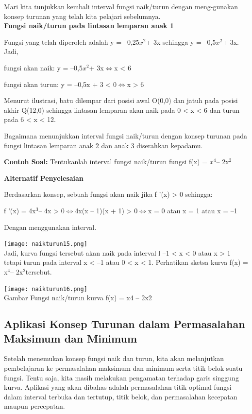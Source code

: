 \documentclass[11pt,fleqn]{book} %
\begin{document}
Mari kita tunjukkan kembali interval fungsi naik/turun dengan meng-gunakan konsep turunan yang telah kita pelajari sebelumnya.\\

\textbf{Fungsi naik/turun pada lintasan lemparan anak 1}

Fungsi yang telah diperoleh adalah y = –0,25$x^{2} $+ 3x sehingga y = –0,5$x^{2} $+ 3x. Jadi,

fungsi akan naik: y = –0,5$x^{2} $+ 3x$ \Leftrightarrow $x < 6

fungsi akan turun: y = –0,5x + 3 < 0$ \Leftrightarrow $x > 6

Menurut ilustrasi, batu dilempar dari posisi awal O(0,0) dan jatuh pada posisi akhir Q(12,0) sehingga lintasan lemparan akan naik pada 0 < x < 6 dan turun pada 6 < x < 12.

Bagaimana menunjukkan interval fungsi naik/turun
dengan konsep turunan pada fungsi lintasan lemparan
anak 2 dan anak 3 diserahkan kepadamu.

\textbf {Contoh Soal:} 
Tentukanlah interval fungsi naik/turun fungsi f(x) = $x^{4} $– 2x$^{2}$

\textbf{Alternatif Penyelesaian}

Berdasarkan konsep, sebuah fungsi akan naik jika f '(x) > 0 sehingga:

f '(x) = 4x$^{3} $– 4x > 0$ \Leftrightarrow $4x(x – 1)(x + 1) > 0$ \Leftrightarrow $x = 0 atau x = 1 atau x = –1

Dengan menggunakan interval.

\texttt{[image: naikturun15.png]}\\

Jadi, kurva fungsi tersebut akan naik pada interval l –1 < x < 0 atau x > 1 tetapi turun pada interval x < –1 atau 0 < x < 1. Perhatikan sketsa kurva f(x) = x$^{4} $– 2x$^{2} $tersebut.\\

\begin{center}
\texttt{[image: naikturun16.png]}\\
Gambar Fungsi naik/turun kurva f(x) = x4 – 2x2
\end{center}

\subsection{Aplikasi Konsep Turunan dalam
Permasalahan Maksimum dan Minimum}

Setelah menemukan konsep fungsi naik dan turun,
kita akan melanjutkan pembelajaran ke permasalahan
maksimum dan minimum serta titik belok suatu fungsi.
Tentu saja, kita masih melakukan pengamatan terhadap
garis singgung kurva. Aplikasi yang akan dibahas adalah permasalahan titik optimal fungsi dalam interval terbuka dan tertutup, titik belok, dan permasalahan kecepatan maupun percepatan.\\
\end{document}
